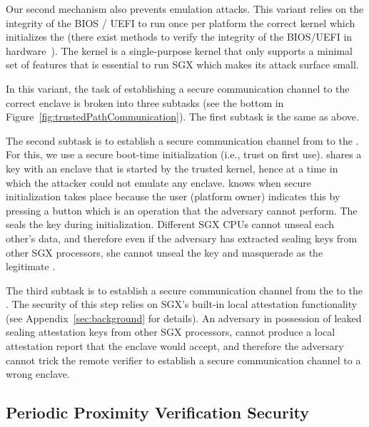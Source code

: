 \ifusenix
\vspace{-14pt}
\else
\fi
{} Our second mechanism also prevents emulation attacks. This variant relies on the integrity of the BIOS / UEFI to run once per platform the correct \name kernel which initializes the \nameclave (there exist methods to verify the integrity of the BIOS/UEFI in hardware~\cite{titanchip}). 
The \name kernel is a single-purpose kernel that only supports a minimal set of features that is essential to run SGX which makes its attack surface small. 

In this variant, the task of establishing a secure communication channel to the correct enclave is broken into three subtasks (see the bottom in Figure~\ref{fig:trustedPathCommunication}). The first subtask is the same as above.

The second subtask is to establish a secure communication channel from \device to the \nameclave. For this, we use a secure boot-time initialization (i.e., trust on first use). \device shares a key with an enclave that is started by the trusted \name kernel, hence at a time in which the attacker could not emulate any enclave. \device knows when secure initialization takes place because the user (platform owner) indicates this by pressing a button which is an operation that the adversary cannot perform. The \nameclave seals the key during initialization. Different SGX CPUs cannot unseal each other's data, and therefore even if the adversary has extracted sealing keys from other SGX processors, she cannot unseal the key and masquerade as the legitimate \nameclave. %

The third subtask is to establish a secure communication channel from the \nameclave to the \app. The security of this step relies on SGX's built-in local attestation functionality (see Appendix~\ref{sec:background} for details). An adversary in possession of leaked sealing attestation keys from other SGX processors, cannot produce a local attestation report that the \name enclave would accept, and therefore the adversary cannot trick the remote verifier to establish a secure communication channel to a wrong enclave.

\subsection{Periodic Proximity Verification Security}


